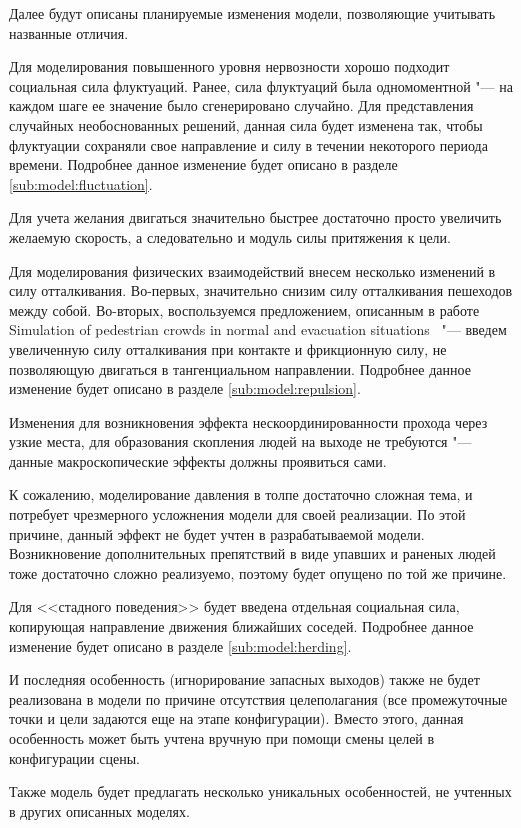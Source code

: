 Далее будут описаны планируемые изменения модели, позволяющие учитывать названные отличия.

Для моделирования повышенного уровня нервозности хорошо подходит социальная сила флуктуаций.
Ранее, сила флуктуаций была одномоментной "--- на каждом шаге ее значение было сгенерировано случайно.
Для представления случайных необоснованных решений, данная сила будет изменена так,
чтобы флуктуации сохраняли свое направление и силу в течении некоторого периода времени.
Подробнее данное изменение будет описано в разделе \ref{sub:model:fluctuation}.

Для учета желания двигаться значительно быстрее достаточно просто увеличить желаемую скорость,
а следовательно и модуль силы притяжения к цели.

Для моделирования физических взаимодействий внесем несколько изменений в силу отталкивания.
Во-первых, значительно снизим силу отталкивания пешеходов между собой.
Во-вторых, воспользуемся предложением, описанным в работе Simulation of pedestrian crowds in normal and evacuation situations~\cite{helbing_evacuation} "---
введем увеличенную силу отталкивания при контакте и фрикционную силу, не позволяющую двигаться в тангенциальном направлении.
Подробнее данное изменение будет описано в разделе \ref{sub:model:repulsion}.

Изменения для возникновения эффекта нескоординированности прохода через узкие места, для образования скопления людей на выходе не требуются "---
данные макроскопические эффекты должны проявиться сами.

К сожалению, моделирование давления в толпе достаточно сложная тема, и потребует чрезмерного усложнения модели для своей реализации.
По этой причине, данный эффект не будет учтен в разрабатываемой модели.
Возникновение дополнительных препятствий в виде упавших и раненых людей тоже достаточно сложно реализуемо, поэтому будет опущено по той же причине.

Для <<стадного поведения>> будет введена отдельная социальная сила, копирующая направление движения ближайших соседей.
Подробнее данное изменение будет описано в разделе \ref{sub:model:herding}.

И последняя особенность (игнорирование запасных выходов) также не будет реализована в модели по причине отсутствия целеполагания
(все промежуточные точки и цели задаются еще на этапе конфигурации).
Вместо этого, данная особенность может быть учтена вручную при помощи смены целей в конфигурации сцены.

Также модель будет предлагать несколько уникальных особенностей, не учтенных в других описанных моделях.

